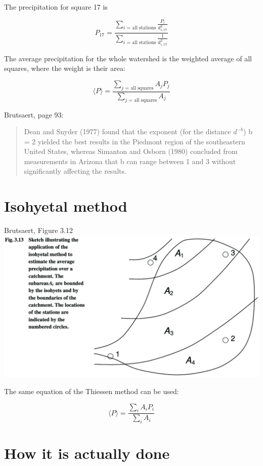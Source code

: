 \documentclass[
  letterpaper,
  DIV=11,
  numbers=noendperiod]{scrreprt}
\begin{document}
The precipitation for square 17 is

\[
P_{17} = 
\displaystyle\frac
{\displaystyle\sum_\text{$i$ = all stations}\frac{P_i}{d_{i,17}^2}}
{\displaystyle\sum_\text{$i$ = all stations}\frac{1}{d_{i,17}^2}}
\]

The average precipitation for the whole watershed is the weighted
average of all squares, where the weight is their area:

\[
\langle P \rangle = 
\displaystyle\frac
{\displaystyle\sum_\text{$j$ = all squares} A_j P_j}
{\displaystyle\sum_\text{$j$ = all squares} A_j}
\]

Brutsaert, page 93:

\begin{quote}
Dean and Snyder (1977) found that the exponent (for the distance
\(d^{-b}\)) b = 2 yielded the best results in the Piedmont region of the
southeastern United States, whereas Simanton and Osborn (1980) concluded
from measurements in Arizona that b can range between 1 and 3 without
significantly affecting the results.
\end{quote}

\hypertarget{isohyetal-method}{%
\section{Isohyetal method}\label{isohyetal-method}}

Brutsaert, Figure 3.12
\includegraphics{archive/figures/brutsaert-figure3.13.png}

The same equation of the Thiessen method can be used:

\[
\langle P \rangle = \frac{\sum_i A_i P_i}{\sum_i A_i}
\]

\hypertarget{how-it-is-actually-done}{%
\section{How it is actually done}\label{how-it-is-actually-done}}
\end{document}
